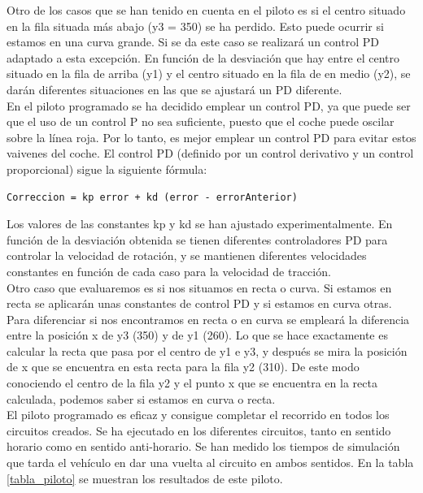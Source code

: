 Otro de los casos que se han tenido en cuenta en el piloto es si el centro situado en la fila situada más abajo (y3 = 350) se ha perdido. Esto puede ocurrir si estamos en una curva grande. Si se da este caso se realizará un control PD adaptado a esta excepción. En función de la desviación que hay entre el centro situado en la fila de arriba (y1) y el centro situado en la fila de en medio (y2), se darán diferentes situaciones en las que se ajustará un PD diferente.\\

En el piloto programado se ha decidido emplear un control PD, ya que puede ser que el uso de un control P no sea suficiente, puesto que el coche puede oscilar sobre la línea roja. Por lo tanto, es mejor emplear un control PD para evitar estos vaivenes del coche. El control PD (definido por un control derivativo y un control proporcional) sigue la siguiente fórmula:\\

\vspace{10pt}
\begin{lstlisting}
Correccion = kp error + kd (error - errorAnterior)
\end{lstlisting}
\vspace{20pt}

Los valores de las constantes kp y kd se han ajustado experimentalmente. En función de la desviación obtenida se tienen diferentes controladores PD para controlar la velocidad de rotación, y se mantienen diferentes velocidades constantes en función de cada caso para la velocidad de tracción.\\

Otro caso que evaluaremos es si nos situamos en recta o curva. Si estamos en recta se aplicarán unas constantes de control PD y si estamos en curva otras. Para diferenciar si nos encontramos en recta o en curva se empleará la diferencia entre la posición x de y3 (350) y de y1 (260). Lo que se hace exactamente es calcular la recta que pasa por el centro de y1 e y3, y después se mira la posición de x que se encuentra en esta recta para la fila y2 (310). De este modo conociendo el centro de la fila y2 y el punto x que se encuentra en la recta calculada, podemos saber si estamos en curva o recta. \\


El piloto programado es eficaz y consigue completar el recorrido en todos los circuitos creados. Se ha ejecutado en los diferentes circuitos, tanto en sentido horario como en sentido anti-horario. Se han medido los tiempos de simulación que tarda el vehículo en dar una vuelta al circuito en ambos sentidos. En la tabla \ref{tabla_piloto} se muestran los resultados de este piloto.\\


